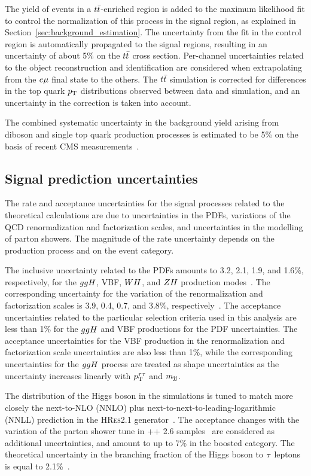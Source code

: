 The yield of events in a $t\bar{t}$-enriched region is added to the maximum likelihood fit to control the normalization of this process
in the signal region, as explained in Section~\ref{sec:background_estimation}. The uncertainty from the fit in the 
control region is automatically propagated to the signal regions, resulting in an uncertainty of about 5\% on the 
$t\bar{t}$ cross section. Per-channel uncertainties related to the object reconstruction and identification are 
considered when extrapolating from the $e\mu$ final state to the others. The $t\bar{t}$ simulation is corrected 
for differences in the top quark $p_\mathrm{T}$ distributions observed between data and simulation, and an uncertainty 
in the correction is taken into account.

The combined systematic uncertainty in the background yield arising from diboson and single top quark production 
processes is estimated to be 5\%
on the basis of recent CMS measurements~\cite{Khachatryan:2016tgp,Sirunyan:2016cdg}.


\subsection{Signal prediction uncertainties}

The rate and acceptance uncertainties for the signal processes related to the theoretical calculations are 
due to uncertainties in the PDFs, variations of the QCD renormalization and factorization scales,
and uncertainties in the modelling of parton showers.
The magnitude of the rate uncertainty depends on the production process and on the event category.

The inclusive uncertainty related to the PDFs amounts to 3.2, 2.1, 1.9, and 1.6\%, respectively, for 
the $ ggH $, VBF, $WH$, and $ZH$ production modes~\cite{deFlorian:2016spz}. The
corresponding uncertainty for the variation of the renormalization and factorization scales is 
3.9, 0.4, 0.7, and 3.8\%, respectively~\cite{deFlorian:2016spz}.
The acceptance uncertainties related to the particular selection criteria used in this analysis are less 
than 1\% for the $ ggH $ and VBF productions for the PDF
uncertainties. The acceptance uncertainties for the VBF production in the renormalization and factorization 
scale uncertainties are also less than 1\%, while the corresponding uncertainties for the $ ggH $ 
process are treated as shape uncertainties as the uncertainty increases
linearly with $p_\mathrm{T}^{\tau\tau}$ and $m_\mathrm{jj}$.

The \pt distribution of the Higgs boson in the {} simulations is tuned to match more closely
the next-to-NLO (NNLO) plus
next-to-next-to-leading-logarithmic (NNLL) prediction in the
\textsc{HRes2.1} generator~\cite{deFlorian:2012mx,Grazzini:2013mca}.
The acceptance changes with the variation of the parton shower tune in \HERWIG++ 2.6 samples~\cite{Bellm:2013hwb} 
are considered as additional uncertainties, and amount to up to 7\% in the boosted category. The theoretical 
uncertainty in the branching fraction of the Higgs boson to $\tau$ leptons is equal to 2.1\%~\cite{deFlorian:2016spz}.


